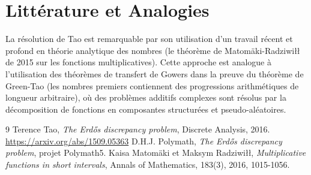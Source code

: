 \documentclass[12pt,a4paper]{article}
\begin{document}
\section{Littérature et Analogies}

La résolution de Tao est remarquable par son utilisation d'un travail récent et profond en théorie analytique des nombres (le théorème de Matomäki-Radziwiłł de 2015 sur les fonctions multiplicatives). Cette approche est analogue à l'utilisation des théorèmes de transfert de Gowers dans la preuve du théorème de Green-Tao (les nombres premiers contiennent des progressions arithmétiques de longueur arbitraire), où des problèmes additifs complexes sont résolus par la décomposition de fonctions en composantes structurées et pseudo-aléatoires.

\begin{thebibliography}{9}
Terence Tao, \textit{The Erdős discrepancy problem}, Discrete Analysis, 2016. \url{https://arxiv.org/abs/1509.05363}
D.H.J. Polymath, \textit{The Erdős discrepancy problem}, projet Polymath5.
Kaisa Matomäki et Maksym Radziwiłł, \textit{Multiplicative functions in short intervals}, Annals of Mathematics, 183(3), 2016, 1015-1056.
\end{thebibliography}
\end{document}
